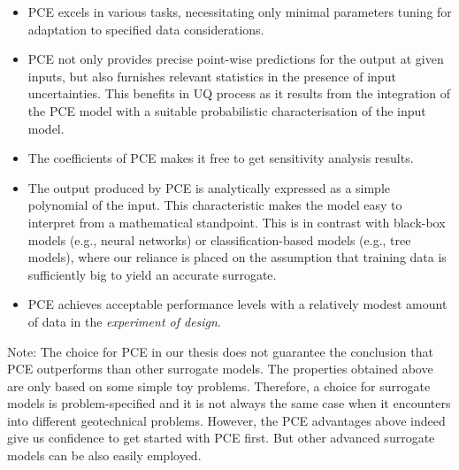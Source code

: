 \begin{itemize}[left=0pt]
    \item \acrshort{PCE} excels in various tasks, necessitating only minimal parameters tuning for adaptation to specified data considerations.
    \item \acrshort{PCE} not only provides precise point-wise predictions for the output at given inputs, but also furnishes relevant statistics in the presence of input uncertainties. This benefits in UQ process as it results from the integration of the \acrshort{PCE} model with a suitable probabilistic characterisation of the input model.
    \item The coefficients of \acrshort{PCE} makes it free to get sensitivity analysis results.
    \item The output produced by \acrshort{PCE} is analytically expressed as a simple polynomial of the input. This characteristic makes the model easy to interpret from a mathematical standpoint. This is in contrast with black-box models (e.g., neural networks) or classification-based models (e.g., tree models), where our reliance is placed on the assumption that training data is sufficiently big to yield an accurate surrogate.
    \item \acrshort{PCE} achieves acceptable performance levels with a relatively 
    modest amount of data in the \textit{experiment of design}.
\end{itemize}
Note: The choice for \acrshort{PCE} in our thesis does not guarantee the conclusion that \acrshort{PCE} outperforms than other surrogate models. The properties obtained above are only based on some simple toy problems. Therefore, a choice for surrogate models is problem-specified and it is not always the same case when it encounters into different geotechnical problems. However, the \acrshort{PCE} advantages above \citep{torre2019} indeed give us confidence to get started with \acrshort{PCE} first. But other advanced surrogate models can be also easily employed.



